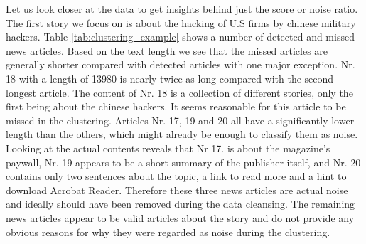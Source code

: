 Let us look closer at the data to get insights behind just the score or noise ratio. The first story we focus on is about the hacking of U.S firms by chinese military hackers. Table \ref{tab:clustering_example} shows a number of detected and missed news articles. Based on the text length we see that the missed articles are generally shorter compared with detected articles with one major exception. Nr. 18 with a length of 13980 is nearly twice as long compared with the second longest article. The content of Nr. 18 is a collection of different stories, only the first being about the chinese hackers. It seems reasonable for this article to be missed in the clustering. Articles Nr. 17, 19 and 20 all have a significantly lower length than the others, which might already be enough to classify them as noise. Looking at the actual contents reveals that Nr 17. is about the magazine's paywall, Nr. 19 appears to be a short summary of the publisher itself, and Nr. 20 contains only two sentences about the topic, a link to read more and a hint to download Acrobat Reader. Therefore these three news articles are actual noise and ideally should have been removed during the data cleansing. The remaining news articles appear to be valid articles about the story and do not provide any obvious reasons for why they were regarded as noise during the clustering.

